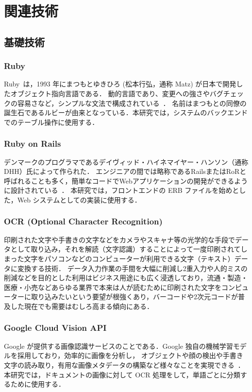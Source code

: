 \chapter{関連技術}
\label{ch:rt}

\quad

\section{基礎技術}
\label{sec:rw_basic}

\subsection{Ruby}
\label{subsec:rw_sub_ruby}
Ruby~\cite{ruby2023}は，1993 年にまつもとゆきひろ (松本行弘，通称 Matz) が日本で開発したオブジェクト指向言語である．
動的言語であり、変更への強さやバグチェックの容易さなど，シンプルな文法で構成されている~\cite{rubybook2024}．
名前はまつもとの同僚の誕生石であるルビーが由来となっている．本研究では，システムのバックエンドでのテーブル操作に使用する．

\subsection{Ruby on {R}ails}
\label{subsec:rw_sub_rails}
デンマークのプログラマであるデイヴィッド・ハイネマイヤー・ハンソン（通称DHH）氏によって作られた．
エンジニアの間では略称であるRailsまたはRoRと呼ばれることも多く，簡単なコードでWebアプリケーションの開発ができるように設計されている~\cite{takahashi2013rails}．
本研究では，フロントエンドの ERB ファイルを始めとした，Web システムとしての実装に使用する．

\subsection{O{C}{R} ({O}ptional {C}haracter {R}ecognition)}
印刷された文字や手書きの文字などをカメラやスキャナ等の光学的な手段でデータとして取り込み，それを解読（文字認識）することによって一度印刷されてしまった文字をパソコンなどのコンピューターが利用できる文字（テキスト）データに変換する技術．
データ入力作業の手間を大幅に削減し2重入力や人的ミスの削減などを目的とした利用はビジネス用途にも広く浸透しており，流通・製造・医療・小売などあらゆる業界で本来は人が読むために印刷された文字をコンピューターに取り込みたいという要望が根強くあり，バーコードや2次元コードが普及した現在でも需要はむしろ高まる傾向にある．

\subsection{Google {C}loud {V}ision {API}}
\label{subsec:rw_sub_ocr}
Google が提供する画像認識サービスのことである．Google 独自の機械学習モデルを採用しており，効率的に画像を分析し，
オブジェクトや顔の検出や手書き文字の読み取り，有用な画像メタデータの構築など様々なことを実現できる~\cite{ohnishi2018ocr}．
本研究では，ドキュメントの画像に対して OCR 処理をして，単語ごとに分類するために使用する．

